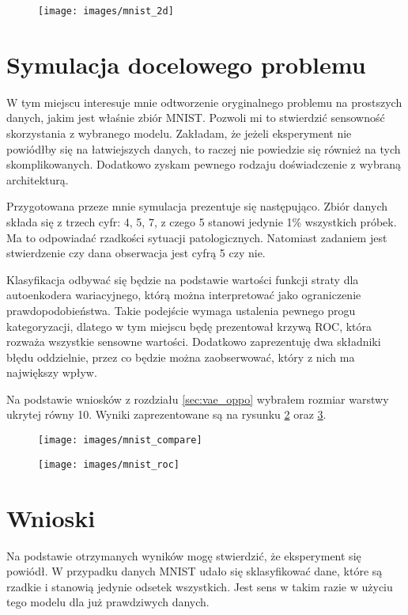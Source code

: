 \begin{figure}[h!]
    \texttt{[image: images/mnist\_2d]}
    \caption{}
    \label{fig:mnist_2d}
\end{figure}

\section{Symulacja docelowego problemu}

W tym miejscu interesuje mnie odtworzenie oryginalnego problemu na prostszych danych, jakim jest właśnie zbiór MNIST. Pozwoli mi to stwierdzić sensowność skorzystania z wybranego modelu. Zakładam, że jeżeli eksperyment nie powiódłby się na łatwiejszych danych, to raczej nie powiedzie się również na tych skomplikowanych. Dodatkowo zyskam pewnego rodzaju doświadczenie z wybraną architekturą.

Przygotowana przeze mnie symulacja prezentuje się następująco. Zbiór danych składa się z trzech cyfr: 4, 5, 7, z czego 5 stanowi jedynie 1\% wszystkich próbek. Ma to odpowiadać rzadkości sytuacji patologicznych. Natomiast zadaniem jest stwierdzenie czy dana obserwacja jest cyfrą 5 czy nie.

Klasyfikacja odbywać się będzie na podstawie wartości funkcji straty dla autoenkodera wariacyjnego, którą można interpretować jako ograniczenie prawdopodobieństwa. Takie podejście wymaga ustalenia pewnego progu kategoryzacji, dlatego w tym miejscu będę prezentował krzywą ROC, która rozważa wszystkie sensowne wartości. Dodatkowo zaprezentuję dwa składniki błędu oddzielnie, przez co będzie można zaobserwować, który z nich ma największy wpływ.

Na podstawie wniosków z rozdziału \ref{sec:vae_oppo} wybrałem rozmiar warstwy ukrytej równy 10. Wyniki zaprezentowane są na rysunku \ref{fig:mnist_compare} oraz \ref{fig:mnist_roc}.

\begin{figure}[h!]
    \centering
    \texttt{[image: images/mnist\_compare]}
    \caption{}
    \label{fig:mnist_compare}
\end{figure}

\begin{figure}[h!]
    \centering
    \texttt{[image: images/mnist\_roc]}
    \caption{}
    \label{fig:mnist_roc}
\end{figure}

\section{Wnioski}

Na podstawie otrzymanych wyników mogę stwierdzić, że eksperyment się powiódł. W przypadku danych MNIST udało się sklasyfikować dane, które są rzadkie i stanowią jedynie odsetek wszystkich. Jest sens w takim razie w użyciu tego modelu dla już prawdziwych danych.
